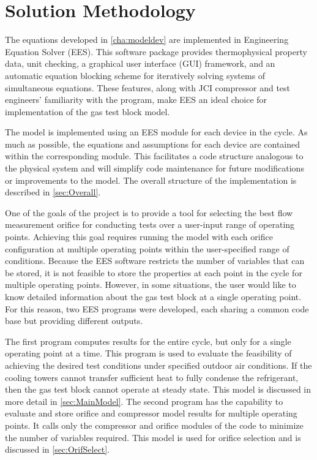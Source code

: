 \chapter{Solution Methodology} \label{cha:solnmethod}

The equations developed in \cref{cha:modeldev} are implemented in
Engineering Equation Solver (EES). 
This software package provides thermophysical property data, unit checking, 
a graphical user interface (GUI) framework, and an automatic equation 
blocking scheme for iteratively solving systems of simultaneous equations. 
These features, along with JCI compressor and test engineers' familiarity with the program, 
make EES an ideal choice for implementation of the gas test block model.

The model is implemented using an EES module for each device in the cycle. 
As much as possible, the equations and assumptions for each device are contained
within the corresponding module.
This facilitates a code structure analogous to the physical system 
and will simplify code maintenance for future modifications or improvements to the model.
The overall structure of the implementation is described in \cref{sec:Overall}.

One of the goals of the project is to provide a tool for selecting the best flow measurement
orifice for conducting tests over a user-input range of operating points.
Achieving this goal requires running the model with each orifice configuration 
at multiple operating points within the user-specified range of conditions.
Because the EES software restricts the number of variables that can be stored,
it is not feasible to store the properties at each point in the cycle for multiple operating points.
However, in some situations, the user would like to know 
detailed information about the gas test block at a single operating point.
For this reason, two EES programs were developed, each sharing a common code base
but providing different outputs. 

The first program computes results for the entire cycle, but only 
for a single operating point at a time.
This program is used to evaluate the feasibility of achieving the desired
test conditions under specified outdoor air conditions.
If the cooling towers cannot transfer sufficient heat to fully condense
the refrigerant, then the gas test block cannot operate at steady state.
This model is discussed in more detail in \cref{sec:MainModel}.
The second program has the capability to evaluate and store orifice and 
compressor model results for multiple operating points.
It calls only the compressor and orifice modules of the code to minimize the number of variables required.
This model is used for orifice selection and is discussed in \cref{sec:OrifSelect}.

